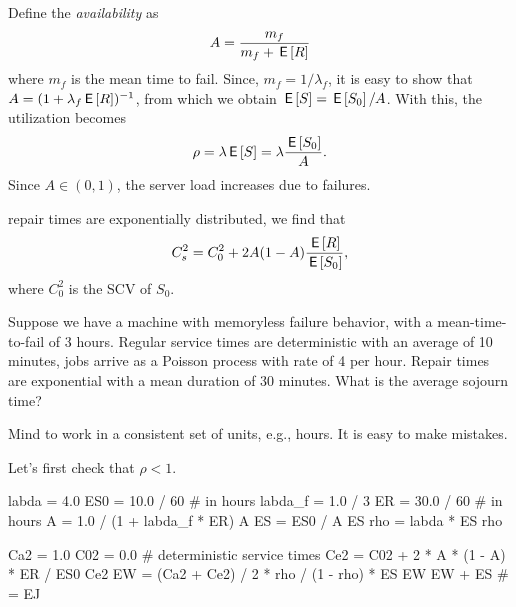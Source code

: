 Define the \emph{availability} as
\begin{equation}\label{eq:91}
 A=\frac{m_f}{m_f + \,\mathsf{E}\left[R\right]}
\end{equation}
where $m_f$ is the mean time to fail. Since, $m_f = 1/\lambda_f$, it is easy to show that $A=(1+\lambda_f \,\mathsf{E}\left[R\right])^{-1}$, from which we obtain
 $\,\mathsf{E}\left[S\right] = \,\mathsf{E}\left[S_0\right]/A$.
With this, the utilization becomes
\begin{equation*}
\rho = \lambda \,\mathsf{E}\left[S\right] = \lambda \frac{\,\mathsf{E}\left[S_0\right]}A.
\end{equation*}
Since $A\in (0,1)$, the server load increases due to failures.


 repair times are exponentially distributed, we  find that
\begin{equation*}
 C_s^2 = C_0^2 + 2 A(1-A) \frac{\,\mathsf{E}\left[R\right]}{\,\mathsf{E}\left[S_0\right]},
\end{equation*}
where $C_0^2$ is the SCV of $S_0$.





\begin{exercise}\label{ex:l-157}
 Suppose we have a machine with memoryless failure behavior, with a mean-time-to-fail of $3$ hours. Regular service times are deterministic with an average of 10 minutes, jobs arrive as a Poisson process with rate of 4 per hour. Repair times are exponential with a mean duration of 30 minutes. What is the average sojourn time?
\begin{hint}
 Mind to work in a consistent set of units, e.g., hours. It is easy to make mistakes.
\end{hint}
\begin{solution}
  Let's first check that $\rho< 1$.
\begin{pyconsole}
labda = 4.0
ES0 = 10.0 / 60  # in hours
labda_f = 1.0 / 3
ER = 30.0 / 60  # in hours
A = 1.0 / (1 + labda_f * ER)
A
ES = ES0 / A
ES
rho = labda * ES
rho
\end{pyconsole}
\begin{pyconsole}
Ca2 = 1.0
C02 = 0.0  # deterministic service times
Ce2 = C02 + 2 * A * (1 - A) * ER / ES0
Ce2
EW = (Ca2 + Ce2) / 2 * rho / (1 - rho) * ES
EW
EW + ES  # = EJ
\end{pyconsole}
\end{solution}
\end{exercise}

